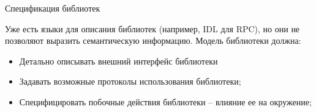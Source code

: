 \documentclass[12pt]{beamer}
\begin{document}
{
\begin{frame}{Спецификация библиотек}
\begin{mybox}[]
	Уже есть языки для описания библиотек (например, IDL для RPC), но они не позволяют выразить семантическую информацию.
	Модель библиотеки должна:
\begin{itemize}
	\item Детально описывать внешний интерфейс библиотеки
	\item Задавать возможные протоколы использования библиотеки;
	\item Специфицировать побочные действия библиотеки – влияние ее на окружение;
\end{itemize}
\end{mybox}
\end{frame}
}
\end{document}
